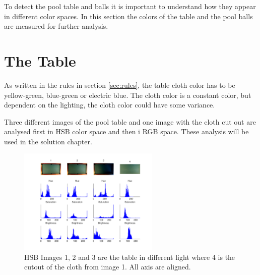 To detect the pool table and balls it is important to understand how they appear in different color spaces. In this section the colors of the table and the pool balls are measured for further analysis.

\section{The Table}
As written in the rules in section \ref{sec:rules}, the table cloth color has to be yellow-green, blue-green or electric blue. The cloth color is a constant color, but dependent on the lighting, the cloth color could have some variance.

Three different images of the pool table and one image with the cloth cut out are analysed first in HSB color space and then i RGB space. These analysis will be used in the solution chapter.

\begin{figure}[H]
\begin{center}
\leavevmode
\includegraphics[width=0.6\textwidth]{images/hsv_hist_table}
\end{center}
\caption{HSB Images 1, 2 and 3 are the table in different light where 4 is the cutout of the cloth from image 1. All axis are aligned.}
\label{fig:tablehsv}
\end{figure} 

